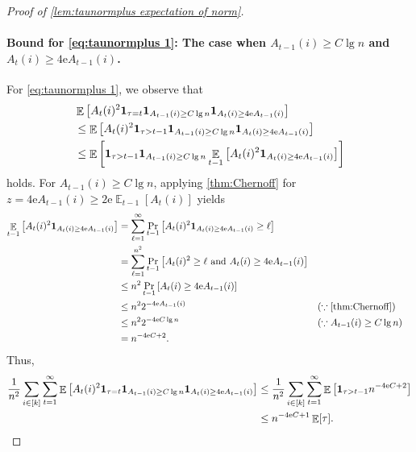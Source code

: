\documentclass[letterpaper,11pt]{article}
\newcommand{\indicator}{\mathbf{1}}
\DeclareMathOperator*{\E}{\mathbb{E}}
\newcommand{\e}{\mathrm{e}}
\begin{document}
\begin{proof}[Proof of \cref{lem:taunormplus expectation of norm}]
    \paragraph{Bound for \cref{eq:taunormplus 1}: The case when $A_{t-1}(i)\geq C\lg n$ and $A_{t}(i)\geq 4\e A_{t-1}(i)$.}
    For \cref{eq:taunormplus 1}, we observe that
    \begin{align*}
        &\E\qty[A_t(i)^2\indicator_{\tau=t}\indicator_{A_{t-1}(i)\geq C\lg n}\indicator_{A_{t}(i)\geq 4\e A_{t-1}(i)}]\\
        &\leq \E\qty[A_t(i)^2\indicator_{\tau>t-1}\indicator_{A_{t-1}(i)\geq C\lg n}\indicator_{A_{t}(i)\geq 4\e A_{t-1}(i)}]\\
        &\leq \E\qty[\indicator_{\tau>t-1}\indicator_{A_{t-1}(i)\geq C\lg n}\E_{t-1}\qty[A_t(i)^2\indicator_{A_{t}(i)\geq 4\e A_{t-1}(i)}]]
    \end{align*}
    holds.
    For $A_{t-1}(i)\geq C\lg n$, applying \cref{thm:Chernoff} for $z=4\e A_{t-1}(i)\geq 2\e\E_{t-1}[A_t(i)]$ yields
    \begin{align*}
        \E_{t-1}\qty[A_t(i)^2\indicator_{A_{t}(i)\geq 4\e A_{t-1}(i)}]
        &=\sum_{\ell=1}^{\infty}\Pr_{t-1}\qty[A_t(i)^2\indicator_{A_{t}(i)\geq 4\e A_{t-1}(i)}\geq \ell]\\
        &=\sum_{\ell=1}^{n^2}\Pr_{t-1}\qty[A_t(i)^2\geq \ell \textrm{ and } A_{t}(i)\geq 4\e A_{t-1}(i)]\\
        &\leq n^2\Pr_{t-1}\qty[A_{t}(i)\geq 4\e A_{t-1}(i)]\\
        &\leq n^2 2^{-4\e A_{t-1}(i)} &&(\because \mathrm{\cref{thm:Chernoff}})\\
        &\leq n^2 2^{-4\e C\lg n}&&(\because A_{t-1}(i)\geq C\lg n)\\
        &=n^{-4\e C+2}.
    \end{align*}
    Thus,
    \begin{align*}
        \frac{1}{n^2}\sum_{i\in [k]}\sum_{t=1}^\infty\E\qty[A_t(i)^2\indicator_{\tau=t}\indicator_{A_{t-1}(i)\geq C\lg n}\indicator_{A_{t}(i)\geq 4\e A_{t-1}(i)}]
        &\leq \frac{1}{n^2}\sum_{i\in [k]}\sum_{t=1}^\infty\E\qty[\indicator_{\tau>t-1}n^{-4\e C+2}]\\
        &\leq n^{-4\e C+1}\E[\tau].
    \end{align*}


\end{proof}
\end{document}
